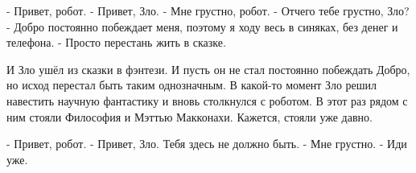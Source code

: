 - Привет, робот.
- Привет, Зло.
- Мне грустно, робот.
- Отчего тебе грустно, Зло?
- Добро постоянно побеждает меня, поэтому я ходу весь в синяках, без денег и телефона.
- Просто перестань жить в сказке.

И Зло ушёл из сказки в фэнтези. И пусть он не стал постоянно побеждать Добро, но исход перестал быть таким однозначным. В какой-то момент Зло решил навестить научную фантастику и вновь столкнулся с роботом. В этот раз рядом с ним стояли Философия и Мэттью Макконахи. Кажется, стояли уже давно.

- Привет, робот.
- Привет, Зло. Тебя здесь не должно быть.
- Мне грустно.
- Иди уже.